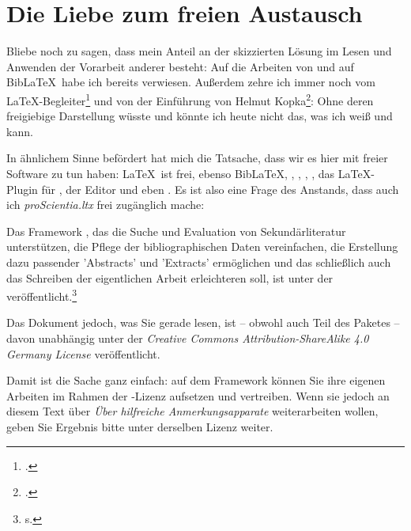 
\section{Die Liebe zum freien Austausch}

Bliebe noch zu sagen, dass mein Anteil an der skizzierten Lösung im Lesen und Anwenden der Vorarbeit anderer besteht: Auf die Arbeiten von  und auf Bib\LaTeX\ habe ich bereits verwiesen. Außerdem zehre ich immer noch vom \LaTeX-Begleiter\footcite[vgl.][S. 741ff]{MitGoo2005a} und von der Einführung von Helmut Kopka\footcite[vgl.][]{Kopka2000a}: Ohne deren freigiebige Darstellung wüsste und könnte ich heute nicht das, was ich weiß und kann.

In ähnlichem Sinne befördert hat mich die Tatsache, dass wir es hier mit freier Software zu tun haben: \LaTeX\ ist frei, ebenso Bib\LaTeX, ,  , , , das \LaTeX-Plugin für , der Editor   und eben . Es ist also eine Frage des Anstands, dass auch ich \textit{proScientia.ltx} frei zugänglich mache:

Das Framework , das die Suche und Evaluation von Sekundärliteratur unterstützen, die Pflege der bibliographischen Daten vereinfachen, die Erstellung dazu passender ’Abstracts’ und ’Extracts’ ermöglichen und das schließlich auch das Schreiben der eigentlichen Arbeit erleichteren soll, ist unter der  veröffentlicht.\footnote{s. }

Das Dokument jedoch, was Sie gerade lesen, ist -- obwohl auch Teil des Paketes -- davon unabhängig unter der \textit{Creative Commons Attribution-ShareAlike 4.0 Germany License} veröffentlicht.

Damit ist die Sache ganz einfach: auf dem Framework  können Sie ihre eigenen Arbeiten im Rahmen der -Lizenz aufsetzen und vertreiben. Wenn sie jedoch an diesem Text über \textit{Über hilfreiche Anmerkungsapparate} weiterarbeiten wollen, geben Sie Ergebnis bitte unter derselben Lizenz weiter.
